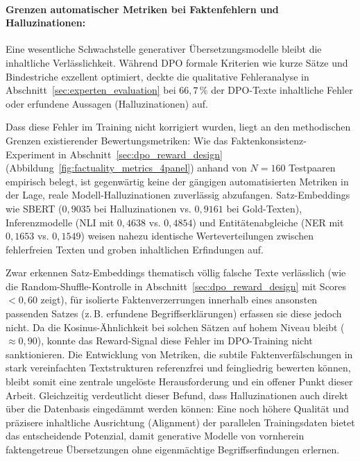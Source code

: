 \paragraph{Grenzen automatischer Metriken bei Faktenfehlern und Halluzinationen:}
Eine wesentliche Schwachstelle generativer Übersetzungsmodelle bleibt die inhaltliche Verlässlichkeit. Während DPO formale Kriterien wie kurze Sätze und Bindestriche exzellent optimiert, deckte die qualitative Fehleranalyse in Abschnitt~\ref{sec:experten_evaluation} bei $66{,}7\,\%$ der DPO-Texte inhaltliche Fehler oder erfundene Aussagen (Halluzinationen) auf. 

Dass diese Fehler im Training nicht korrigiert wurden, liegt an den methodischen Grenzen existierender Bewertungsmetriken: Wie das Faktenkonsistenz-Experiment in Abschnitt~\ref{sec:dpo_reward_design} (Abbildung~\ref{fig:factuality_metrics_4panel}) anhand von $N=160$ Testpaaren empirisch belegt, ist gegenwärtig keine der gängigen automatisierten Metriken in der Lage, reale Modell-Halluzinationen zuverlässig abzufangen. Satz-Embeddings wie SBERT ($0{,}9035$ bei Halluzinationen vs. $0{,}9161$ bei Gold-Texten), Inferenzmodelle (NLI mit $0{,}4638$ vs. $0{,}4854$) und Entitätenabgleiche (NER mit $0{,}1653$ vs. $0{,}1549$) weisen nahezu identische Werteverteilungen zwischen fehlerfreien Texten und groben inhaltlichen Erfindungen auf.

Zwar erkennen Satz-Embeddings thematisch völlig falsche Texte verlässlich (wie die Random-Shuffle-Kontrolle in Abschnitt~\ref{sec:dpo_reward_design} mit Scores $< 0{,}60$ zeigt), für isolierte Faktenverzerrungen innerhalb eines ansonsten passenden Satzes (z.\,B. erfundene Begriffserklärungen) erfassen sie diese jedoch nicht. Da die Kosinus-Ähnlichkeit bei solchen Sätzen auf hohem Niveau bleibt ($\approx 0{,}90$), konnte das Reward-Signal diese Fehler im DPO-Training nicht sanktionieren. Die Entwicklung von Metriken, die subtile Faktenverfälschungen in stark vereinfachten Textstrukturen referenzfrei und feingliedrig bewerten können, bleibt somit eine zentrale ungelöste Herausforderung und ein offener Punkt dieser Arbeit. Gleichzeitig verdeutlicht dieser Befund, dass Halluzinationen auch direkt über die Datenbasis eingedämmt werden können: Eine noch höhere Qualität und präzisere inhaltliche Ausrichtung (Alignment) der parallelen Trainingsdaten bietet das entscheidende Potenzial, damit generative Modelle von vornherein faktengetreue Übersetzungen ohne eigenmächtige Begriffserfindungen erlernen.

